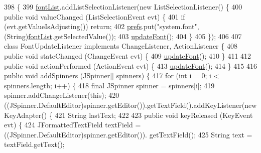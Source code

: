 \begin{DoxyCode}
398                                      \{
399         \mbox{\hyperlink{classorg_1_1newdawn_1_1slick_1_1tools_1_1hiero_1_1_hiero_aab47a05761c02f71b369618db21bbb17}{fontList}}.addListSelectionListener(\textcolor{keyword}{new} ListSelectionListener() \{
400             \textcolor{keyword}{public} \textcolor{keywordtype}{void} valueChanged (ListSelectionEvent evt) \{
401                 \textcolor{keywordflow}{if} (evt.getValueIsAdjusting()) \textcolor{keywordflow}{return};
402                 \mbox{\hyperlink{classorg_1_1newdawn_1_1slick_1_1tools_1_1hiero_1_1_hiero_aa7062bea3ffd4639b589cd06000dbfc6}{prefs}}.put(\textcolor{stringliteral}{"system.font"}, (String)\mbox{\hyperlink{classorg_1_1newdawn_1_1slick_1_1tools_1_1hiero_1_1_hiero_aab47a05761c02f71b369618db21bbb17}{fontList}}.getSelectedValue());
403                 \mbox{\hyperlink{classorg_1_1newdawn_1_1slick_1_1tools_1_1hiero_1_1_hiero_aaee4b931c33090913c970c8484c90af7}{updateFont}}();
404             \}
405         \});
406 
407         \textcolor{keyword}{class }FontUpdateListener \textcolor{keyword}{implements} ChangeListener, ActionListener \{
408             \textcolor{keyword}{public} \textcolor{keywordtype}{void} stateChanged (ChangeEvent evt) \{
409                 \mbox{\hyperlink{classorg_1_1newdawn_1_1slick_1_1tools_1_1hiero_1_1_hiero_aaee4b931c33090913c970c8484c90af7}{updateFont}}();
410             \}
411 
412             \textcolor{keyword}{public} \textcolor{keywordtype}{void} actionPerformed (ActionEvent evt) \{
413                 \mbox{\hyperlink{classorg_1_1newdawn_1_1slick_1_1tools_1_1hiero_1_1_hiero_aaee4b931c33090913c970c8484c90af7}{updateFont}}();
414             \}
415 
416             \textcolor{keyword}{public} \textcolor{keywordtype}{void} addSpinners (JSpinner[] spinners) \{
417                 \textcolor{keywordflow}{for} (\textcolor{keywordtype}{int} i = 0; i < spinners.length; i++) \{
418                     \textcolor{keyword}{final} JSpinner spinner = spinners[i];
419                     spinner.addChangeListener(\textcolor{keyword}{this});
420                     ((JSpinner.DefaultEditor)spinner.getEditor()).getTextField().addKeyListener(\textcolor{keyword}{new} 
      KeyAdapter() \{
421                         String lastText;
422 
423                         \textcolor{keyword}{public} \textcolor{keywordtype}{void} keyReleased (KeyEvent evt) \{
424                             JFormattedTextField textField = ((JSpinner.DefaultEditor)spinner.getEditor()).
      getTextField();
425                             String text = textField.getText();

\end{DoxyCode}
